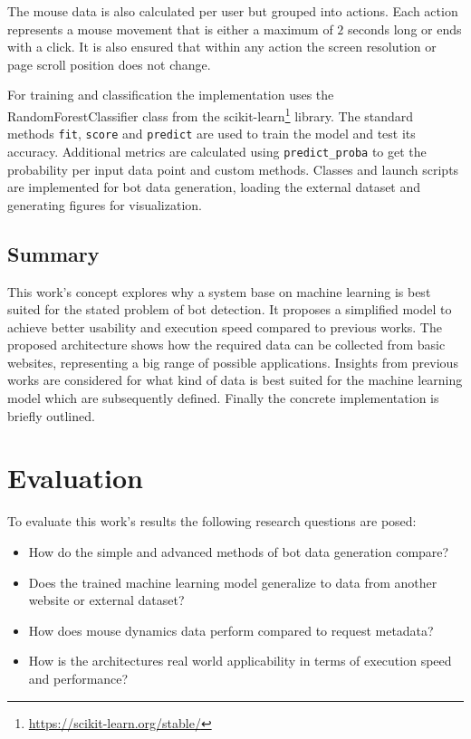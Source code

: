 \documentclass[
    fontsize=12pt,
    headings=small,
    parskip=half,           %
    bibliography=totoc,
    numbers=noenddot,       %
    open=any,               %
    final,                   %
    table
]{scrreprt}
\begin{document}
The mouse data is also calculated per user but grouped into actions. Each action represents a mouse movement that is either a maximum of $2$ seconds long or ends with a click. It is also ensured that within any action the screen resolution or page scroll position does not change.

For training and classification the implementation uses the RandomForestClassifier class from the scikit-learn\footnote{\url{https://scikit-learn.org/stable/}} library. The standard methods \lstinline{fit}, \lstinline{score} and \lstinline{predict} are used to train the model and test its accuracy. Additional metrics are calculated using \lstinline{predict_proba} to get the probability per input data point and custom methods. Classes and launch scripts are implemented for bot data generation, loading the external dataset and generating figures for visualization.


\section{Summary}

This work's concept explores why a system base on machine learning is best suited for the stated problem of bot detection. It proposes a simplified model to achieve better usability and execution speed compared to previous works. The proposed architecture shows how the required data can be collected from basic websites, representing a big range of possible applications. Insights from previous works are considered for what kind of data is best suited for the machine learning model which are subsequently defined. Finally the concrete implementation is briefly outlined.


\label{sec:eval}
\chapter{Evaluation}

To evaluate this work's results the following research questions are posed:

\begin{itemize}
    \item How do the simple and advanced methods of bot data generation compare?
    \item Does the trained machine learning model generalize to data from another website or external dataset?
    \item How does mouse dynamics data perform compared to request metadata?
    \item How is the architectures real world applicability in terms of execution speed and performance?

\end{itemize}
\end{document}
